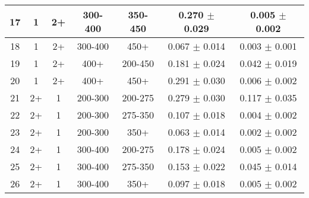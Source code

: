 \begin{table}[htbp]
\begin{centering}
\begin{lrbox}{\closureBox}
\begin{tabular}{|c|c|c|c|c||c|c|}
             17 &               1 &              2+ &         300-400 &         350-450 &   0.270 $\pm$ 0.029 & 0.005 $\pm$ 0.002 \\
 \hline                                                                                      
             18 &               1 &              2+ &         300-400 &            450+ &   0.067 $\pm$ 0.014 & 0.003 $\pm$ 0.001 \\
 \hline                                                                                      
             19 &               1 &              2+ &            400+ &         200-450 &   0.181 $\pm$ 0.024 & 0.042 $\pm$ 0.019 \\
 \hline                                                                                      
             20 &               1 &              2+ &            400+ &            450+ &   0.291 $\pm$ 0.030 & 0.006 $\pm$ 0.002 \\
 \hline                                                                                      
             21 &              2+ &               1 &         200-300 &         200-275 &   0.279 $\pm$ 0.030 & 0.117 $\pm$ 0.035 \\
 \hline                                                                                      
             22 &              2+ &               1 &         200-300 &         275-350 &   0.107 $\pm$ 0.018 & 0.004 $\pm$ 0.002 \\
 \hline                                                                                      
             23 &              2+ &               1 &         200-300 &            350+ &   0.063 $\pm$ 0.014 & 0.002 $\pm$ 0.002 \\
 \hline                                                                                      
             24 &              2+ &               1 &         300-400 &         200-275 &   0.178 $\pm$ 0.024 & 0.005 $\pm$ 0.002 \\
 \hline                                                                                      
             25 &              2+ &               1 &         300-400 &         275-350 &   0.153 $\pm$ 0.022 & 0.045 $\pm$ 0.014 \\
 \hline                                                                                      
             26 &              2+ &               1 &         300-400 &            350+ &   0.097 $\pm$ 0.018 & 0.005 $\pm$ 0.002 \\
 \hline                                                                                      

\end{tabular}
\end{lrbox}
\end{centering}
\end{table}
